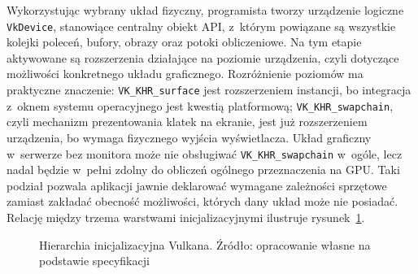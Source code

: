Wykorzystując wybrany układ fizyczny, programista tworzy urządzenie logiczne
\texttt{VkDevice}, stanowiące centralny obiekt API, z~którym powiązane są wszystkie kolejki poleceń, 
bufory, obrazy oraz potoki obliczeniowe. Na tym etapie aktywowane są
rozszerzenia działające na poziomie urządzenia, czyli dotyczące możliwości konkretnego
układu graficznego. Rozróżnienie poziomów ma praktyczne znaczenie: \texttt{VK\_KHR\_surface}
jest rozszerzeniem instancji, bo integracja z~oknem systemu operacyjnego jest kwestią
platformową; \texttt{VK\_KHR\_swapchain}, czyli mechanizm prezentowania klatek na ekranie,
jest już rozszerzeniem urządzenia, bo wymaga fizycznego wyjścia wyświetlacza. Układ
graficzny w~serwerze bez monitora może nie obsługiwać \texttt{VK\_KHR\_swapchain} w~ogóle,
lecz nadal będzie w~pełni zdolny do obliczeń ogólnego przeznaczenia na GPU. Taki podział
pozwala aplikacji jawnie deklarować wymagane zależności sprzętowe zamiast zakładać
obecność możliwości, których dany układ może nie posiadać.
Relację między trzema warstwami inicjalizacyjnymi ilustruje rysunek~\ref{fig:vulkan_hierarchy}.

\begin{figure}[ht]
\centering
{}
\caption{Hierarchia inicjalizacyjna Vulkana. Źródło: opracowanie własne na podstawie specyfikacji \cite{vulkan-spec}}
\label{fig:vulkan_hierarchy}
\end{figure}

